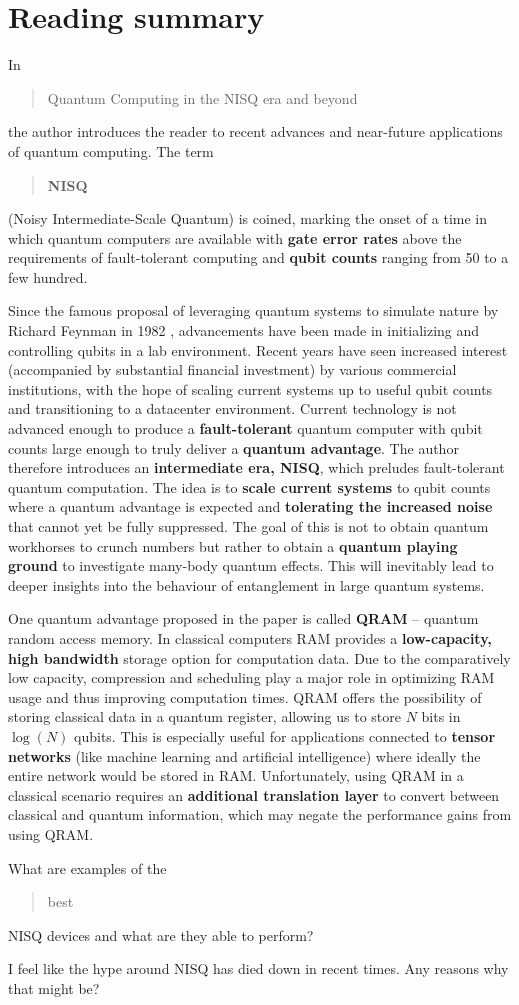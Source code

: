 \documentclass{alex_summary}
\begin{document}
\section*{Reading summary}
In \blockcquote{preskill_quantum_2018}{Quantum Computing in the NISQ era and beyond} the author introduces the reader to recent advances and near-future applications of quantum computing. The term \blockquote{\textbf{NISQ}} (Noisy Intermediate-Scale Quantum) is coined, marking the onset of a time in which quantum computers are available with \textbf{gate error rates} above the requirements of fault-tolerant computing and \textbf{qubit counts} ranging from 50 to a few hundred.

Since the famous proposal of leveraging quantum systems to simulate nature by Richard Feynman in 1982 \autocite{feynman_simulating_1982}, advancements have been made in initializing and controlling qubits in a lab environment. Recent years have seen increased interest (accompanied by substantial financial investment) by various commercial institutions, with the hope of scaling current systems up to useful qubit counts and transitioning to a datacenter environment. Current technology is not advanced enough to produce a \textbf{fault-tolerant} quantum computer with qubit counts large enough to truly deliver a \textbf{quantum advantage}. The author therefore introduces an \textbf{intermediate era, NISQ}, which preludes fault-tolerant quantum computation. The idea is to \textbf{scale current systems} to qubit counts where a quantum advantage is expected and \textbf{tolerating the increased noise} that cannot yet be fully suppressed. The goal of this is not to obtain quantum workhorses to crunch numbers but rather to obtain a \textbf{quantum playing ground} to investigate many-body quantum effects. This will inevitably lead to deeper insights into the behaviour of entanglement in large quantum systems. 

One quantum advantage proposed in the paper is called \textbf{QRAM} -- quantum random access memory. In classical computers RAM provides a \textbf{low-capacity, high bandwidth} storage option for computation data. Due to the comparatively low capacity, compression and scheduling play a major role in optimizing RAM usage and thus improving computation times. QRAM offers the possibility of storing classical data in a quantum register, allowing us to store \( N \) bits in \( \log(N) \) qubits. This is especially useful for applications connected to \textbf{tensor networks} (like machine learning and artificial intelligence) where ideally the entire network would be stored in RAM. Unfortunately, using QRAM in a classical scenario requires an \textbf{additional translation layer} to convert between classical and quantum information, which may negate the performance gains from using QRAM. \\ 

\begin{question1}
	What are examples of the \blockquote{best} NISQ devices and what are they able to perform?
\end{question1}

\begin{question3}
	I feel like the hype around NISQ has died down in recent times. Any reasons why that might be?
\end{question3}

\printbibliography
\end{document}
